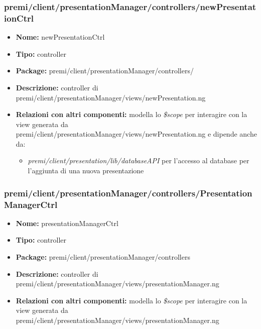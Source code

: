 \subsubsection{premi/client/presentationManager/controllers/newPresentationCtrl}
\begin{itemize}
  \item[] \textbf{Nome:} newPresentationCtrl
  \item[] \textbf{Tipo:} controller
  \item[] \textbf{Package:} premi/client/presentationManager/controllers/
  \item[] \textbf{Descrizione:} controller di premi/client/presentationManager/views/newPresentation.ng
  \item[] \textbf{Relazioni con altri componenti:} modella lo \textit{\$scope} per interagire con la view generata da premi/client/presentationManager/views/newPresentation.ng e dipende anche da:
 \begin{itemize}
 \item \textit{premi/client/presentation/lib/databaseAPI} per l'accesso al database per l'aggiunta di una nuova presentazione
 \end{itemize}
\end{itemize}

\subsubsection{premi/client/presentationManager/controllers/PresentationManagerCtrl}
\begin{itemize}
  \item[] \textbf{Nome:} presentationManagerCtrl
  \item[] \textbf{Tipo:} controller
  \item[] \textbf{Package:} premi/client/presentationManager/controllers
  \item[] \textbf{Descrizione:}  controller di premi/client/presentationManager/views/presentationManager.ng
  \item[] \textbf{Relazioni con altri componenti:} modella lo \textit{\$scope} per interagire con la view generata da premi/client/presentationManager/views/presentationManager.ng
\end{itemize}

